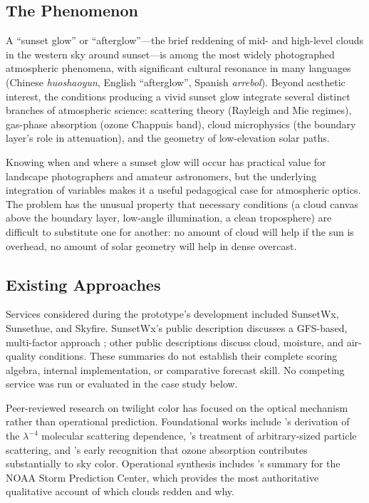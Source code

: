 \documentclass[11pt,a4paper]{article}
\begin{document}
\subsection{The Phenomenon}

A ``sunset glow'' or ``afterglow''---the brief reddening of mid- and high-level clouds in the western sky around sunset---is among the most widely photographed atmospheric phenomena, with significant cultural resonance in many languages (Chinese \textit{huoshaoyun}, English ``afterglow'', Spanish \textit{arrebol}). Beyond aesthetic interest, the conditions producing a vivid sunset glow integrate several distinct branches of atmospheric science: scattering theory (Rayleigh and Mie regimes), gas-phase absorption (ozone Chappuis band), cloud microphysics (the boundary layer's role in attenuation), and the geometry of low-elevation solar paths.

Knowing when and where a sunset glow will occur has practical value for landscape photographers and amateur astronomers, but the underlying integration of variables makes it a useful pedagogical case for atmospheric optics. The problem has the unusual property that necessary conditions (a cloud canvas above the boundary layer, low-angle illumination, a clean troposphere) are difficult to substitute one for another: no amount of cloud will help if the sun is overhead, no amount of solar geometry will help in dense overcast.

\subsection{Existing Approaches}

Services considered during the prototype's development included SunsetWx, Sunsethue, and Skyfire. SunsetWx's public description discusses a GFS-based, multi-factor approach \citep{forecastingbeauty2015}; other public descriptions discuss cloud, moisture, and air-quality conditions. These summaries do not establish their complete scoring algebra, internal implementation, or comparative forecast skill. No competing service was run or evaluated in the case study below.

Peer-reviewed research on twilight color has focused on the optical mechanism rather than operational prediction. Foundational works include \citet{strutt1871scattering}'s derivation of the $\lambda^{-4}$ molecular scattering dependence, \citet{mie1908beitrage}'s treatment of arbitrary-sized particle scattering, and \citet{hulburt1953explanation}'s early recognition that ozone absorption contributes substantially to sky color. Operational synthesis includes \citet{corfidi2014colors}'s summary for the NOAA Storm Prediction Center, which provides the most authoritative qualitative account of which clouds redden and why.
\end{document}
